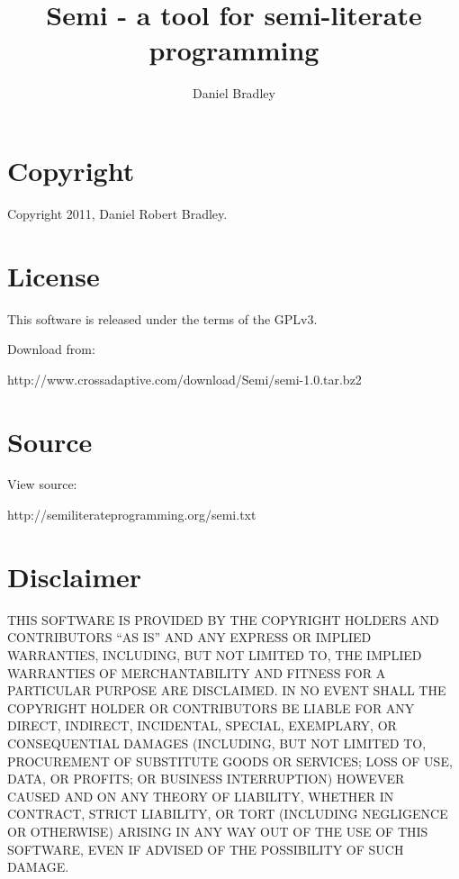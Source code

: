 \documentclass[]{article}
\begin{document}
\title{	Semi - a tool for semi-literate programming}
\author{	Daniel Bradley}
\maketitle
\section*{	Copyright}

Copyright 2011, Daniel Robert Bradley.

\section*{	License}

This software is released under the terms of the GPLv3.


Download from:

\begin{verbatimtab}
http://www.crossadaptive.com/download/Semi/semi-1.0.tar.bz2

\end{verbatimtab}
\section*{	Source}

View source:

\begin{verbatimtab}
http://semiliterateprogramming.org/semi.txt

\end{verbatimtab}
\section*{	Disclaimer}

THIS SOFTWARE IS PROVIDED BY THE COPYRIGHT HOLDERS AND CONTRIBUTORS ``AS IS'' AND ANY EXPRESS OR IMPLIED WARRANTIES, INCLUDING, BUT NOT LIMITED TO, THE IMPLIED WARRANTIES OF MERCHANTABILITY AND FITNESS FOR A PARTICULAR PURPOSE ARE DISCLAIMED. IN NO EVENT SHALL THE COPYRIGHT HOLDER OR CONTRIBUTORS BE LIABLE FOR ANY DIRECT, INDIRECT, INCIDENTAL, SPECIAL, EXEMPLARY, OR CONSEQUENTIAL DAMAGES (INCLUDING, BUT NOT LIMITED TO, PROCUREMENT OF SUBSTITUTE GOODS OR SERVICES; LOSS OF USE, DATA, OR PROFITS; OR BUSINESS INTERRUPTION) HOWEVER CAUSED AND ON ANY THEORY OF LIABILITY, WHETHER IN CONTRACT, STRICT LIABILITY, OR TORT (INCLUDING NEGLIGENCE OR OTHERWISE) ARISING IN ANY WAY OUT OF THE USE OF THIS SOFTWARE, EVEN IF ADVISED OF THE POSSIBILITY OF SUCH DAMAGE.
\end{document}

